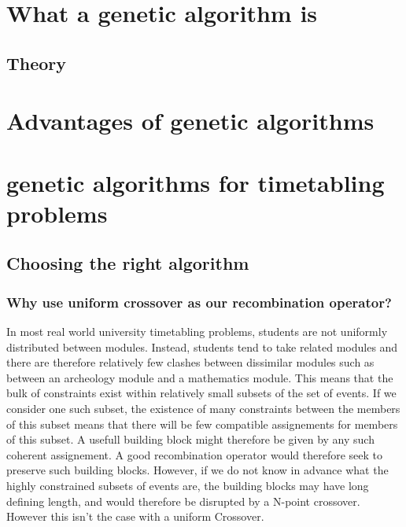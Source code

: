 \documentclass[12pt]{report}
\begin{document}
  \section{What a genetic algorithm is}
  \subsection{Theory}
  \section{Advantages of genetic algorithms}
  \section{genetic algorithms for timetabling problems}
  \subsection{Choosing the right algorithm}
  \subsubsection{Why use uniform crossover as our recombination operator?}
  In most real world university timetabling problems, students are not uniformly
  distributed between modules. Instead, students tend to take related modules
  and there are therefore relatively few clashes between dissimilar modules such
  as between an archeology module and a mathematics module. This means that the
  bulk of constraints exist within relatively small subsets of the set of
  events. If we consider one such subset, the existence of many constraints
  between the members of this subset means that there will be few compatible
  assignements for members of this subset. A usefull building block might
  therefore be given by any such coherent assignement.\cite{Fang}
  A good recombination operator would therefore seek to preserve such building
  blocks. However, if we do not know in advance what the highly constrained
  subsets of events are, the building blocks may have long defining length, and
  would therefore be disrupted by a N-point crossover. However this isn't the
  case with a uniform Crossover.
\end{document}
